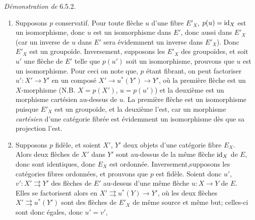 \documentclass[10pt]{../fichiers-configuration-latex/smfart}
\def\labelenumi{(\theenumi)}
\begin{document}
\noindent \emph{Démonstration de} 6.5.2.
\begin{enumerate}
\renewcommand{\theenumi}{\roman{enumi}}
\renewcommand{\labelenumi}{(\theenumi)}
\item Supposons $p$ conservatif. Pour toute flèche $u$ d'une fibre
  $E'_X$, $p(u)=\operatorname{id}_X$ est un isomorphisme, donc $u$ est un
  isomorphisme dans $E'$, donc aussi dans $E'_X$ (car un inverse de
  $u$ dans $E'$ sera évidemment un inverse dans $E'_X$). Donc $E'_X$
  est un groupoïde. Inversement, supposons les $E'_X$ des
  groupoïdes, et soit $u'$ une flèche de $E'$ telle que $p(u')$
  soit un isomorphisme, prouvons que $u$ est un isomorphisme. Pour
  ceci on note que, $p$ étant fibrant, on peut factoriser
  $u':X'\rightarrow Y'$ en un composé $X'\rightarrow
  u^\ast(Y')\rightarrow Y'$, où la première flèche est un
  $X$-morphisme (N.B. $X=p(X')$, $u=p(u')$) et la deuxième est un
  morphisme cartésien au-dessus de $u$. La première flèche est
  un isomorphisme puisque $E'_X$ est un groupoïde, et la deuxième
  l'est, car un morphisme \emph{cartésien} %
d'une catégorie fibrée
  est évidemment un isomorphisme dès que sa projection l'est.

\item Supposons $p$ fidèle, et soient $X'$, $Y'$ deux objets d'une
  catégorie fibre $E_X$. Alors deux flèches de $X'$ dans $Y'$ sont
  au-dessus de la même flèche $\operatorname{id}_X$ de $E$, donc sont identiques,
  donc $E_X$ est ordonnée. Inversement,\pageoriginale supposons les
  catégories fibres ordonnées, et prouvons que $p$ est
  fidèle. Soient donc $u'$, $v':X'\rightrightarrows Y'$ des
  flèches de $E'$ au-dessus d'une même flèche $u:X\rightarrow Y$
  de $E$. Elles se factorisent alors en $X'\rightrightarrows
  u^\ast(Y)\rightarrow Y'$, où les deux flèches
  $X'\rightrightarrows u^\ast(Y')$ sont des flèches de $E'_X$ de
  même source et même but; celles-ci sont donc égales, donc
  $u'=v'$, \cqfd
\end{enumerate}
\end{document}
